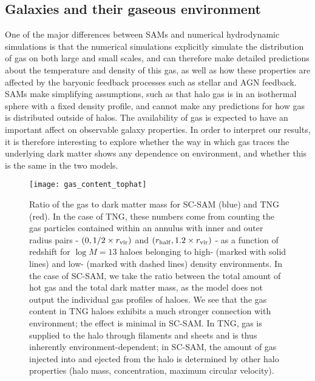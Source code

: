\documentclass[fleqn,usenatbib]{mnras}
\begin{document}
\subsection{Galaxies and their gaseous environment}
\label{sec:env}
One of the major differences between SAMs and numerical hydrodynamic simulations is that the numerical simulations explicitly simulate the distribution of gas on both large and small scales, and can therefore make detailed predictions about the temperature and density of this gas, as well as how these properties are affected by the baryonic feedback processes such as stellar and AGN feedback. SAMs make simplifying assumptions, such as that halo gas is in an isothermal sphere with a fixed density profile, and cannot make any predictions for how gas is distributed outside of halos. The availability of gas is expected to have an important affect on observable galaxy properties.  In order to interpret our results, it is therefore interesting to explore whether the way in which gas traces the underlying dark matter shows any dependence on environment, and whether this is the same in the two models. 


\begin{figure}
\centering  
\texttt{[image: gas\_content\_tophat]}
\caption{Ratio of the gas to dark matter mass for SC-SAM (blue) and TNG (red). In the case of TNG, these numbers come from counting the gas particles contained within an annulus with inner and outer radius pairs -  $(0, 1/2 \times r_{\rm vir})$ and $(r_{\rm half}, 1.2 \times r_{\rm vir})$ - as a function of redshift for $\log M = 13$ haloes belonging to high- (marked with solid lines) and low- (marked with dashed lines) density environments. In the case of SC-SAM, we take the ratio between the total amount of hot gas and the total dark matter mass, as the model does not output the individual gas profiles of haloes. We see that the gas content in TNG haloes exhibits a much stronger connection with environment; the effect is minimal in SC-SAM. In TNG, gas is supplied to the halo through filaments and sheets and is thus inherently environment-dependent; in SC-SAM, the amount of gas injected into and ejected from the halo is determined by other halo properties (halo mass, concentration, maximum circular velocity).}
\label{fig:gas_content_env}
\end{figure}
\end{document}
